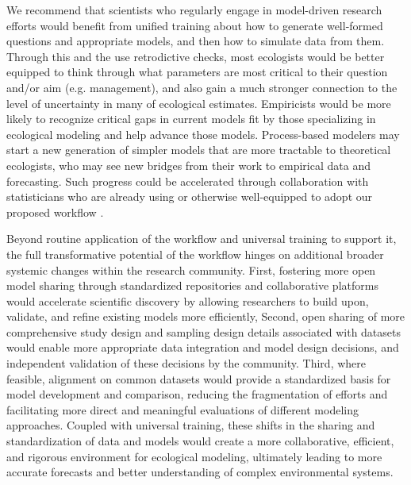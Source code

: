 \documentclass[11pt]{article}
\newcommand{\llabel}[1]{\hypertarget{lintarget:#1}{}\linelabel{lin:#1}}
\begin{document}
We recommend that scientists who regularly engage in model-driven research efforts would benefit from unified training about how to generate well-formed questions and appropriate models, and then how to simulate data from them. Through this and the use retrodictive checks, most ecologists would be better equipped to think through what parameters are most critical to their question and/or aim (e.g. management), and also gain a much stronger connection to the level of uncertainty in many of ecological estimates. Empiricists would be more likely to recognize critical gaps in current models fit by those specializing in ecological modeling and help advance those models. Process-based modelers may start a new generation of simpler models that are more tractable to theoretical ecologists, who may see new bridges from their work to empirical data and forecasting. \llabel{collab}Such progress could be accelerated through collaboration with statisticians who are already using or otherwise well-equipped to adopt our proposed workflow \citep{betanworkflow,Gelman2020, grinsztajn2021,vandeschoot2021}. %

\llabel{studydesignandmore}Beyond routine application of the workflow and universal training to support it, the full transformative potential of the workflow hinges on additional broader systemic changes within the research community. First, fostering more open model sharing through standardized repositories and collaborative platforms would accelerate scientific discovery by allowing researchers to build upon, validate, and refine existing models more efficiently, Second, open sharing of more comprehensive study design and sampling design details associated with datasets would enable more appropriate data integration and model design decisions, and independent validation of these decisions by the community. Third, where feasible, alignment on common datasets would provide a standardized basis for model development and comparison, reducing the fragmentation of efforts and facilitating more direct and meaningful evaluations of different modeling approaches. Coupled with universal training, these shifts in the sharing and standardization of data and models would create a more collaborative, efficient, and rigorous environment for ecological modeling, ultimately leading to more accurate forecasts and better understanding of complex environmental systems.
\end{document}
